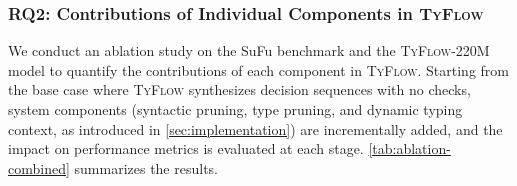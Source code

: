 \documentclass[manuscript,screen]{acmart}
\newcommand{\toolname}[1]{\textsc{#1}}
\newcommand{\mainname}{\toolname{TyFlow}\xspace}
\begin{document}

 \subsubsection{RQ2: Contributions of Individual Components in \mainname}
   {\color{revblue}We } conduct an ablation study on the SuFu benchmark and the \mainname-220M model to quantify the contributions of each component in \mainname. Starting from the base case where \mainname synthesizes decision sequences with no checks, system components (syntactic pruning, type pruning, and dynamic typing context, as introduced in \autoref{sec:implementation}) are incrementally added, and the impact on performance metrics is evaluated at each stage. 
 \autoref{tab:ablation-combined} {\color{revblue}summarizes the results.
} 
\end{document}
